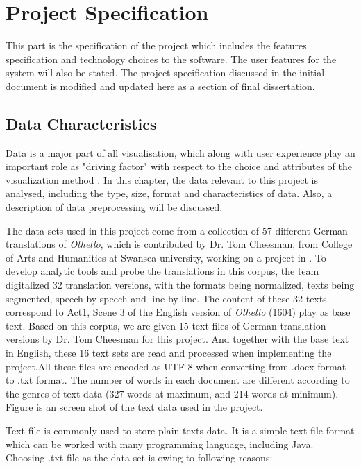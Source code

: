 \clearpage
\section{Project Specification}
This part is the specification of the project which includes the features specification and technology choices to the software. The user features for the system will also be stated. The project specification discussed in the initial document is modified and updated here as a section of final dissertation.

\subsection{Data Characteristics}

Data is a major part of all visualisation, which along with user experience play an important role as "driving factor" with respect to the choice and attributes of the visualization method \cite{Laramee}. In this chapter, the data relevant to this project is analysed, including the type, size, format and characteristics of data. Also, a description of data preprocessing will be discussed. 

The data sets used in this project come from a collection of 57 different German translations of \emph{Othello}, which is contributed by Dr. Tom Cheesman, from College of Arts and Humanities at Swansea university, working on a project in \cite{Tom2012}. To develop analytic tools and probe the translations in this corpus, the team digitalized 32 translation versions, with the formats being normalized, texts being segmented, speech by speech and line by line. The content of these 32 texts correspond to Act1, Scene 3 of the English version of \emph{Othello} (1604) play as base text. Based on this corpus, we are given 15 text files of German translation versions by Dr. Tom Cheesman for this project. And together with the base text in English, these 16 text sets are read and processed when implementing the project.All these files are encoded as UTF-8 when converting from .docx format to .txt format. The number of words in each document are different according to the genres of text data (327 words at maximum, and 214 words at minimum). Figure \label{dataExample} is an screen shot of the text data used in the project.

Text file is commonly used to store plain texts data. It is a simple text file format which can be worked with many programming language, including Java. Choosing .txt file as the data set is owing to following reasons:

